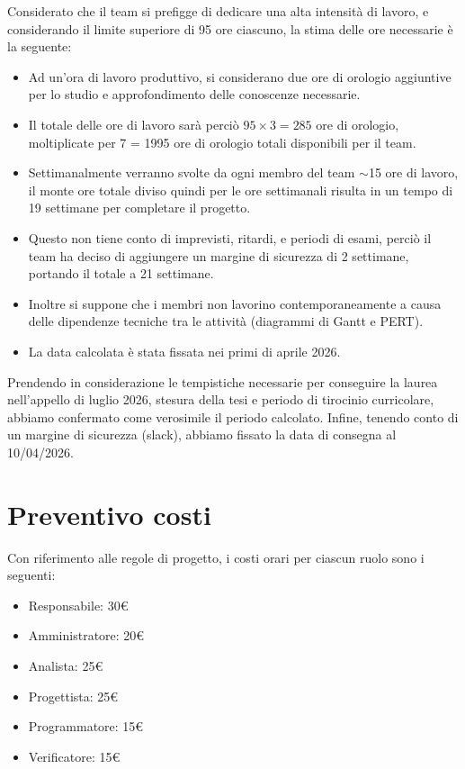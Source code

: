 \documentclass[a4paper,12pt]{article}
\begin{document}
\noindent Considerato che il team si prefigge di dedicare una alta intensità di lavoro, e considerando il limite superiore di 95 ore ciascuno, la stima delle ore necessarie è la seguente:

\begin{itemize}
    \item Ad un'ora di lavoro produttivo, si considerano due ore di orologio aggiuntive per lo studio e approfondimento delle conoscenze necessarie.
    \item Il totale delle ore di lavoro sarà perciò $95 \times 3 = 285$ ore di orologio, moltiplicate per 7 = 1995 ore di orologio totali disponibili per il team.
    \item Settimanalmente verranno svolte da ogni membro del team $\sim$15 ore di lavoro, il monte ore totale diviso quindi per le ore settimanali risulta in un tempo di 19 settimane per completare il progetto.
    \item Questo non tiene conto di imprevisti, ritardi, e periodi di esami, perciò il team ha deciso di aggiungere un margine di sicurezza di 2 settimane, portando il totale a 21 settimane.
    \item Inoltre si suppone che i membri non lavorino contemporaneamente a causa delle dipendenze tecniche tra le attività (diagrammi di Gantt e PERT).
    \item La data calcolata è stata fissata nei primi di aprile 2026.
\end{itemize}

\noindent Prendendo in considerazione le tempistiche necessarie per conseguire la laurea nell'appello di luglio 2026, stesura della tesi e periodo di tirocinio curricolare, abbiamo confermato come verosimile il periodo calcolato. Infine, tenendo conto di un margine di sicurezza (slack), abbiamo fissato la data di consegna al 10/04/2026.

\section{Preventivo costi}
Con riferimento alle regole di progetto, i costi orari per ciascun ruolo sono i seguenti:
\begin{itemize} [noitemsep]
    \item Responsabile: 30€
    \item Amministratore: 20€
    \item Analista: 25€
    \item Progettista: 25€
    \item Programmatore: 15€
    \item Verificatore: 15€
\end{itemize}
\end{document}
